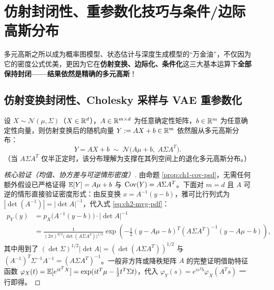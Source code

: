 \section{仿射封闭性、重参数化技巧与条件/边际高斯分布}
\label{sec:ch2-affine-cond}

多元高斯之所以成为概率图模型、状态估计与深度生成模型的“万金油”，不仅因为它的密度公式优美，更因为它在\textbf{仿射变换、边际化、条件化}这三大基本运算下\textbf{全部保持封闭——结果依然是精确的多元高斯}！

\subsection{仿射变换封闭性、Cholesky 采样与 VAE 重参数化}

\begin{thmBox}
\begin{theorem}[多元高斯的仿射变换封闭性]
\label{thm:ch2-affine}
设 $X \sim \mathcal{N}(\mu, \Sigma)$（$X \in \mathbb{R}^d$），$A \in \mathbb{R}^{m\times d}$ 为任意确定性矩阵，$b \in \mathbb{R}^m$ 为任意确定性向量，则仿射变换后的随机向量 $Y := A X + b \in \mathbb{R}^m$ 依然服从多元高斯分布：
\begin{equation}
  Y = A X + b \;\sim\; \mathcal{N}\bigl(A\mu + b,\; A\Sigma A^T\bigr). \label{eq:ch2-affine}
\end{equation}
（当 $A\Sigma A^T$ 仅半正定时，该分布理解为支撑在其列空间上的退化多元高斯分布。）
\end{theorem}
\end{thmBox}

\begin{proof}[核心验证（均值、协方差与可逆情形密度）]
由命题 \ref{prop:ch1-cov-psd}，无需任何额外假设已严格证得 $\mathbb{E}[Y] = A\mu + b$ 与 $\operatorname{Cov}(Y) = A\Sigma A^T$。下面对 $m=d$ 且 $A$ 可逆的情形直接验证密度形式：由反变换 $x = A^{-1}(y - b)$，雅可比行列式为 $|\det(A^{-1})| = |\det A|^{-1}$，代入式 \eqref{eq:ch2-mvg-pdf}：
\begin{align*}
  p_Y(y) &= p_X\bigl(A^{-1}(y - b)\bigr)\cdot |\det A|^{-1} \\
  &= \frac{1}{(2\pi)^{d/2}\bigl(\det(A\Sigma A^T)\bigr)^{1/2}}
    \exp\!\left(-\frac{1}{2}(y - A\mu - b)^T (A\Sigma A^T)^{-1}(y - A\mu - b)\right),
\end{align*}
其中用到了 $(\det\Sigma)^{1/2}|\det A| = (\det(A\Sigma A^T))^{1/2}$ 与 $(A^{-1})^T\Sigma^{-1}A^{-1} = (A\Sigma A^T)^{-1}$。一般非方阵或降秩矩阵 $A$ 的完整证明借助特征函数 $\varphi_X(t) = \mathbb{E}[e^{it^T X}] = \exp(it^T\mu - \frac{1}{2}t^T\Sigma t)$，代入 $\varphi_Y(s) = e^{is^T b}\varphi_X(A^T s)$ 一行即得。
\end{proof}

